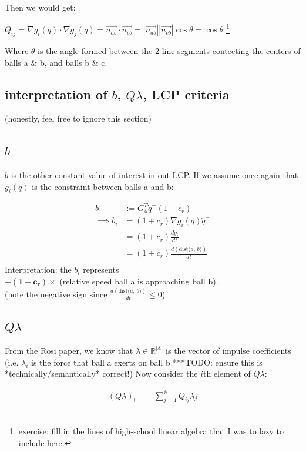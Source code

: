 \documentclass[12pt]{article}
\newcommand{\GA}{G_{\mathbb{A}}}
\newcommand{\bigA}{{\mathbb{A}}}
\newcommand{\dist}[2]{\text{dist(} #1 \text{, } #2 \text{)}}
\begin{document}
Then we would get:

$Q_{ij}
    = \nabla g_i(q) \cdot \nabla g_j(q)
    = \vec{n_{ab}} \cdot \vec{n_{cb}}
    = |\vec{n_{ab}}||\vec{n_{cb}}|\cos{\theta}
    = \cos{\theta}
$ \footnote{
    exercise: fill in the lines of high-school linear algebra that I was to lazy to include here.
}

Where $\theta$ is the angle formed between the 2 line segments contecting the centers of balls a \& b, and balls b \& c.

\subsection{interpretation of $b$, $Q \lambda$, LCP criteria}

(honestly, feel free to ignore this section)

\subsection*{$b$}

$b$ is the other constant value of interest in out LCP. If we assume once again that
$g_i(q)$ is the constraint between balls a and b:

\begin{align*}
    b   &:= \GA^T \dot{q}^-(1 + c_r)\\
    \implies b_i &= (1 + c_r) \nabla g_i(q) \dot{q}^-\\
    &= (1 + c_r) \frac{dg_i}{dt}\\
    &= (1 + c_r) \frac{d(\dist{a}{b})}{dt}\\
\end{align*}
Interpretation: the $b_i$ represents\\
\indent $\mathbf{-(1+c_r)} \times$ (relative speed ball a is approaching ball b).\\
(note the negative sign since $\frac{d(\dist{a}{b})}{dt} \leq 0$)

\subsection*{$Q \lambda$}

From the Rosi paper, we know that $\lambda \in \mathbb{R}^{|\mathbb{A}|}$ is the vector of
impulse coefficients (i.e. $\lambda_i$ is the force that ball a exerts on ball b
***TODO: ensure this is *technically/semantically* correct!)
Now consider the $i$th element of $Q\lambda$:

\begin{align*}
(Q \lambda)_i 
    &= \sum_{j = 1}^{\bigA} Q_{ij} \lambda_j\\
\end{align*}
\end{document}
